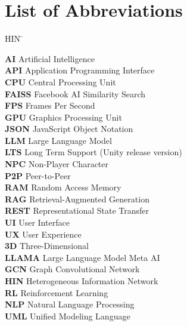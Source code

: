 \chapter*{List of Abbreviations}

\vspace{1cm}

\begin{tabbing}
HIN \hspace{5cm} \= \kill

\textbf{AI}      \> Artificial Intelligence \\
\textbf{API}     \> Application Programming Interface \\
\textbf{CPU}     \> Central Processing Unit \\
\textbf{FAISS}   \> Facebook AI Similarity Search \\
\textbf{FPS}     \> Frames Per Second \\
\textbf{GPU}     \> Graphics Processing Unit \\
\textbf{JSON}    \> JavaScript Object Notation \\
\textbf{LLM}     \> Large Language Model \\
\textbf{LTS}     \> Long Term Support (Unity release version) \\
\textbf{NPC}     \> Non-Player Character \\
\textbf{P2P}     \> Peer-to-Peer \\
\textbf{RAM}     \> Random Access Memory \\
\textbf{RAG}     \> Retrieval-Augmented Generation \\
\textbf{REST}    \> Representational State Transfer \\
\textbf{UI}      \> User Interface \\
\textbf{UX}      \> User Experience \\
\textbf{3D}      \> Three-Dimensional \\
\textbf{LLAMA}   \> Large Language Model Meta AI \\
\textbf{GCN}     \> Graph Convolutional Network \\
\textbf{HIN}     \> Heterogeneous Information Network \\
\textbf{RL}      \> Reinforcement Learning \\
\textbf{NLP}     \> Natural Language Processing \\
\textbf{UML}     \> Unified Modeling Language \\
\end{tabbing}
